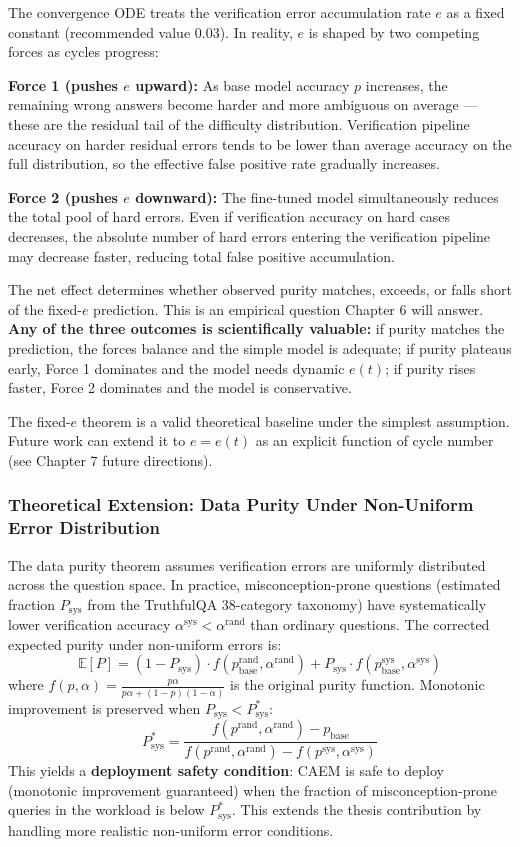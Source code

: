 \documentclass[12pt,a4paper]{article}
\theoremstyle{definition}
\begin{document}
The convergence ODE treats the verification error accumulation rate $e$ as a fixed constant (recommended value 0.03). In reality, $e$ is shaped by two competing forces as cycles progress:

\textbf{Force 1 (pushes $e$ upward):} As base model accuracy $p$ increases, the remaining wrong answers become harder and more ambiguous on average — these are the residual tail of the difficulty distribution. Verification pipeline accuracy on harder residual errors tends to be lower than average accuracy on the full distribution, so the effective false positive rate gradually increases.

\textbf{Force 2 (pushes $e$ downward):} The fine-tuned model simultaneously reduces the total pool of hard errors. Even if verification accuracy on hard cases decreases, the absolute number of hard errors entering the verification pipeline may decrease faster, reducing total false positive accumulation.

The net effect determines whether observed purity matches, exceeds, or falls short of the fixed-$e$ prediction. This is an empirical question Chapter 6 will answer. \textbf{Any of the three outcomes is scientifically valuable:} if purity matches the prediction, the forces balance and the simple model is adequate; if purity plateaus early, Force 1 dominates and the model needs dynamic $e(t)$; if purity rises faster, Force 2 dominates and the model is conservative.

The fixed-$e$ theorem is a valid theoretical baseline under the simplest assumption. Future work can extend it to $e = e(t)$ as an explicit function of cycle number (see Chapter 7 future directions).

\subsubsection{Theoretical Extension: Data Purity Under Non-Uniform Error Distribution}

The data purity theorem assumes verification errors are uniformly distributed across the question space. In practice, misconception-prone questions (estimated fraction $P_{\text{sys}}$ from the TruthfulQA 38-category taxonomy) have systematically lower verification accuracy $\alpha^{\text{sys}} < \alpha^{\text{rand}}$ than ordinary questions. The corrected expected purity under non-uniform errors is:
\[
\mathbb{E}[P] = (1 - P_{\text{sys}}) \cdot f(p_{\text{base}}^{\text{rand}}, \alpha^{\text{rand}}) + P_{\text{sys}} \cdot f(p_{\text{base}}^{\text{sys}}, \alpha^{\text{sys}})
\]
where $f(p,\alpha) = \frac{p\alpha}{p\alpha + (1-p)(1-\alpha)}$ is the original purity function. Monotonic improvement is preserved when $P_{\text{sys}} < P_{\text{sys}}^*$:
\[
P_{\text{sys}}^* = \frac{f(p^{\text{rand}},\alpha^{\text{rand}}) - p_{\text{base}}}{f(p^{\text{rand}},\alpha^{\text{rand}}) - f(p^{\text{sys}},\alpha^{\text{sys}})}
\]
This yields a \textbf{deployment safety condition}: CAEM is safe to deploy (monotonic improvement guaranteed) when the fraction of misconception-prone queries in the workload is below $P_{\text{sys}}^*$. This extends the thesis contribution by handling more realistic non-uniform error conditions.
\end{document}
